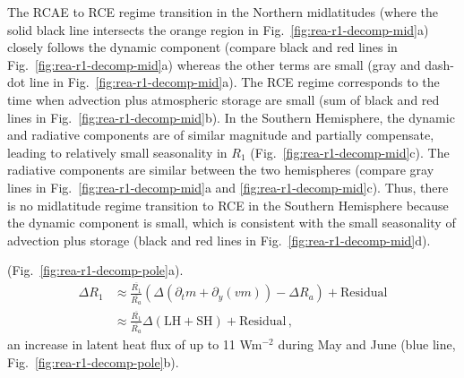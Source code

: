 \documentclass{ametsocV5}
\begin{document}
    The RCAE to RCE regime transition in the Northern midlatitudes (where the solid black line intersects the orange region in Fig.~\ref{fig:rea-r1-decomp-mid}a) closely follows the dynamic component (compare black and red lines in Fig.~\ref{fig:rea-r1-decomp-mid}a) whereas the other terms are small (gray and dash-dot line in Fig.~\ref{fig:rea-r1-decomp-mid}a). The RCE regime corresponds to the time when advection plus atmospheric storage are small (sum of black and red lines in Fig.~\ref{fig:rea-r1-decomp-mid}b). In the Southern Hemisphere, the dynamic and radiative components are of similar magnitude and partially compensate, leading to relatively small seasonality in $R_1$ (Fig.~\ref{fig:rea-r1-decomp-mid}c). The radiative components are similar between the two hemispheres (compare gray lines in Fig.~\ref{fig:rea-r1-decomp-mid}a and \ref{fig:rea-r1-decomp-mid}c). Thus, there is no midlatitude regime transition to RCE in the Southern Hemisphere because the dynamic component is small, which is consistent with the small seasonality of advection plus storage (black and red lines in Fig.~\ref{fig:rea-r1-decomp-mid}d).

     (Fig.~\ref{fig:rea-r1-decomp-pole}a).
    \begin{align}
      \Delta R_1 &\approx \frac{\overline{R_1}}{\overline{R_a}}\left( \Delta(\partial_t m + \partial_y (vm))  - \Delta R_a \right) + \mathrm{Residual} \\
      &\approx \frac{\overline{R_1}}{\overline{R_a}}\Delta(\mathrm{LH+SH}) + \mathrm{Residual} \, ,
    \end{align}
     an increase in latent heat flux of up to 11 Wm$^{-2}$ during May and June (blue line, Fig.~\ref{fig:rea-r1-decomp-pole}b). 
    
\end{document}
